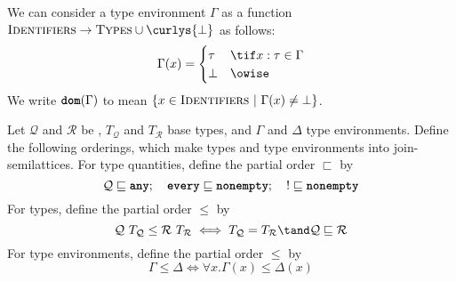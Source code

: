 \documentclass[10pt]{article}
\begin{document}
\begin{definition}
    We can consider a type environment $\Gamma$ as a function $\textsc{Identifiers}\xspace \to \textsc{Types}\xspace \cup \curlys{\bot}$ as follows:
    \[
        \Gamma(x) =
        \begin{cases}
            \tau & \tif x : \tau \in \Gamma \\
            \bot & \owise
        \end{cases}
    \]
    We write $\textbf{\texttt{dom}}(\Gamma)$ to mean $\left\{ {x \in \textsc{Identifiers}} ~|~ {\Gamma(x) \neq \bot} \right\}$.
\end{definition}

\begin{definition}
    Let $\mathcal{Q}$ and $\mathcal{R}$ be \typeQuantities, $T_\mathcal{Q}$ and $T_\mathcal{R}$ base types, and $\Gamma$ and $\Delta$ type environments.
    Define the following orderings, which make types and type environments into join-semilattices.
    For type quantities, define the partial order $\sqsubset$ by
    \[
        \mathcal{Q} \sqsubseteq \textbf{\texttt{any}}; \quad \textbf{\texttt{every}} \sqsubseteq \textbf{\texttt{nonempty}}; \quad ! \sqsubseteq \textbf{\texttt{nonempty}}
    \]
    For types, define the partial order $\leq$ by
    \[
        \mathcal{Q}~T_\mathcal{Q} \leq \mathcal{R}~T_\mathcal{R} \iff T_\mathcal{Q} = T_\mathcal{R} \tand \mathcal{Q} \sqsubseteq \mathcal{R}
    \]
    For type environments, define the partial order $\leq$ by
    \[
        \Gamma \leq \Delta \iff \forall x. \Gamma(x) \leq \Delta(x)
    \]
\end{definition}
\end{document}
